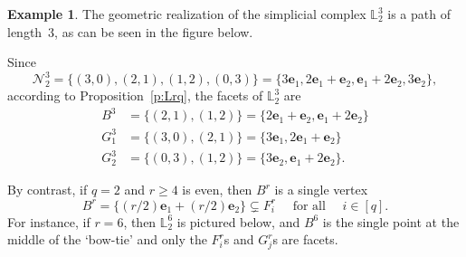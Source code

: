 \documentclass[11pt]{article}
\theoremstyle{definition}
\newtheorem{exam}[theo]{Example}
\numberwithin{equation}{section}
\newcommand{\N}{\mathcal{N}}
\newcommand{\LL}{\mathbb{L}}
\newcommand{\be}{\mathbf{e}}
\newcommand{\qforall}{\quad \mbox{ for all } \quad }
\begin{document}
\begin{exam}\label{e:q=2}
The geometric realization of the simplicial complex $\LL^3_2$
is a path of length~3, as can be seen in the figure below.

\begin{center}
\end{center}
Since $$\N^3_2 =\{(3,0),(2,1),(1,2),(0,3)\} = \{3\be_1, 2\be_1+\be_2, \be_1+2\be_2, 3\be_2\},$$ according to Proposition~\ref{p:Lrq}, the facets of
$\LL^3_2$ are
\begin{align*}
B^3 &= \{(2,1),(1,2)\} = \{2\be_1 + \be_2, \be_1+ 2\be_2\}\\
G^3_1 &= \{(3,0),(2,1)\} = \{3\be_1, 2\be_1 + \be_2\}\\
G^3_2 &= \{(0,3),(1,2)\} = \{3\be_2, \be_1 + 2\be_2\}.
\end{align*}


By contrast, if $q=2$ and $r \geq 4$ is even, then
$B^r$ is a single vertex
$$B^r = \{(r/2)\be_1 + (r/2)\be_2 \} \subsetneq F^r_i \qforall i \in
[q].$$ For instance, if $r=6$, then $\LL^6_2$ is pictured below, and
$B^6$ is the single point at the middle of the `bow-tie' and only the
$F^r_i$s and $G^r_j$s are facets.


\end{exam}
\end{document}
